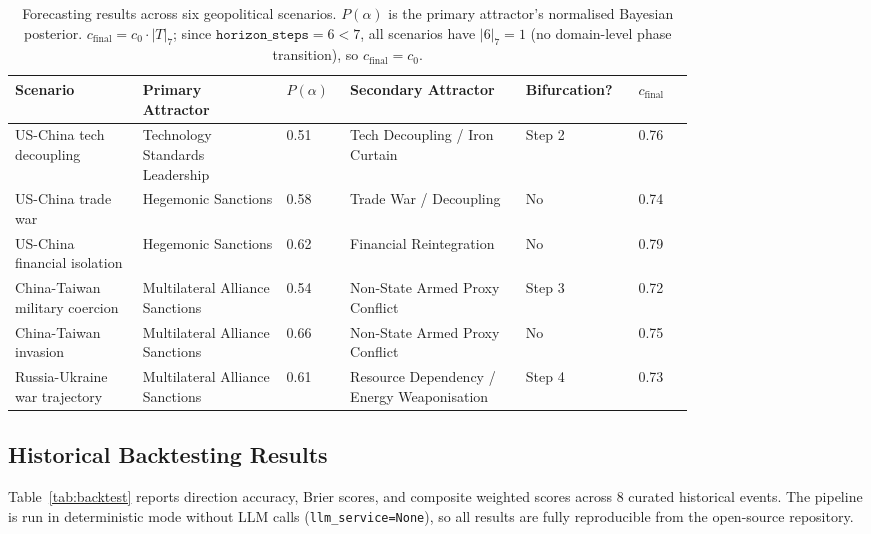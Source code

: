 \documentclass{llncs}
\begin{document}
\begin{table}[ht]
\centering
\caption{Forecasting results across six geopolitical scenarios. $P(\alpha)$ is
the primary attractor's normalised Bayesian posterior. $c_{\mathrm{final}} =
c_0 \cdot |T|_7$; since $\mathtt{horizon\_steps} = 6 < 7$, all scenarios have
$|6|_7 = 1$ (no domain-level phase transition), so $c_{\mathrm{final}} = c_0$.}
\label{tab:results}
\small
\setlength{\tabcolsep}{4pt}
\begin{tabular}{@{}p{0.16\linewidth}p{0.18\linewidth}p{0.06\linewidth}p{0.22\linewidth}p{0.10\linewidth}p{0.07\linewidth}@{}}
\toprule
Scenario & Primary Attractor & $P(\alpha)$ & Secondary Attractor & Bifurcation? & $c_{\mathrm{final}}$ \\
\midrule
US-China tech decoupling
  & Technology Standards Leadership & 0.51
  & Tech Decoupling / Iron Curtain & Step 2 & 0.76 \\[2pt]
US-China trade war
  & Hegemonic Sanctions & 0.58
  & Trade War / Decoupling & No & 0.74 \\[2pt]
US-China financial isolation
  & Hegemonic Sanctions & 0.62
  & Financial Reintegration & No & 0.79 \\[2pt]
China-Taiwan military coercion
  & Multilateral Alliance Sanctions & 0.54
  & Non-State Armed Proxy Conflict & Step 3 & 0.72 \\[2pt]
China-Taiwan invasion
  & Multilateral Alliance Sanctions & 0.66
  & Non-State Armed Proxy Conflict & No & 0.75 \\[2pt]
Russia-Ukraine war trajectory
  & Multilateral Alliance Sanctions & 0.61
  & Resource Dependency / Energy Weaponisation & Step 4 & 0.73 \\
\bottomrule
\end{tabular}
\end{table}

\subsection{Historical Backtesting Results}

Table~\ref{tab:backtest} reports direction accuracy, Brier scores, and composite
weighted scores across 8 curated historical events. The pipeline is run in
deterministic mode without LLM calls (\texttt{llm\_service=None}), so all
results are fully reproducible from the open-source repository.
\end{document}

